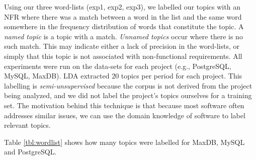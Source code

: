 \documentclass[smallextended]{svjour3}       %
\begin{document}
Using our three word-lists (\textsf{exp1}, \textsf{exp2}, \textsf{exp3}), we labelled our topics with an NFR where there was a match between a word in
the list and the same word somewhere in the frequency distribution of words that constitute the topic.
A \emph{named topic} is a topic with a match. 
\emph{Unnamed topics} occur where there is no such match. 
This may indicate either a lack of precision in the word-lists, or simply that this topic is not associated with non-functional
requirements.
All experiments were run on the data-sets for each project (e.g., PostgreSQL, MySQL, MaxDB). LDA
extracted $20$ topics per period for each project.
This labelling is \emph{semi-unsupervised} because the corpus is not derived from 
the project being analyzed, and we did not label the project's topics
ourselves for a training set. The motivation behind this technique is that
because most software often addresses similar issues, we can use the 
domain knowledge of software to label relevant topics.


Table \ref{tbl:wordlist} shows how many topics were labelled for MaxDB, MySQL and PostgreSQL.
\end{document}

